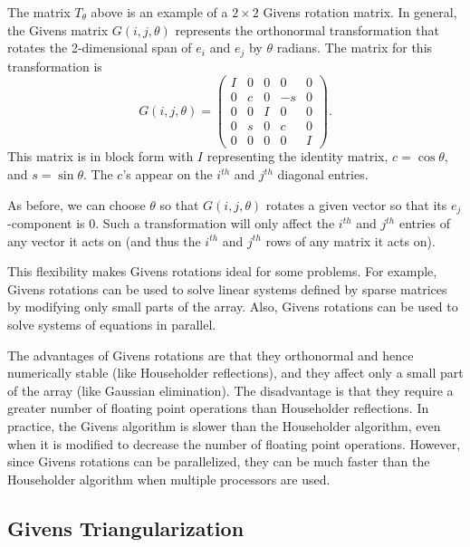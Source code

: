 The matrix $T_{\theta}$ above is an example of a $2 \times 2$ Givens rotation matrix.
In general, the Givens matrix $G(i,j,\theta)$ represents the orthonormal transformation that rotates the 2-dimensional span of $e_i$ and $e_j$ by $\theta$ radians.
The matrix for this transformation is
\begin{equation*}
G(i,j,\theta) = \begin{pmatrix}
I & 0 & 0 & 0 & 0 \\
0 & c & 0 & -s & 0 \\
0 & 0 & I & 0 & 0 \\
0 & s & 0 & c & 0 \\
0 & 0 & 0 & 0 & I
\end{pmatrix}.
\end{equation*}
This matrix is in block form with $I$ representing the identity matrix, $c=\cos \theta$, and $s=\sin \theta$.
The $c$'s appear on the $i^{th}$ and $j^{th}$ diagonal entries.

As before, we can choose $\theta$ so that $G(i,j,\theta)$ rotates a given vector so that its $e_j$-component is 0.
Such a transformation will only affect the $i^{th}$ and $j^{th}$ entries of any vector it acts on (and thus the $i^{th}$ and $j^{th}$ rows of any matrix it acts on).

This flexibility makes Givens rotations ideal for some problems.
For example, Givens rotations can be used to solve linear systems defined by sparse matrices by modifying only small parts of the array.
Also, Givens rotations can be used to solve systems of equations in parallel.

The advantages of Givens rotations are that they orthonormal and hence numerically stable (like Householder reflections), and they affect only a small part of the array (like Gaussian elimination).
The disadvantage is that they require a greater number of floating point operations than Householder reflections.
In practice, the Givens algorithm is slower than the Householder algorithm, even when it is modified to decrease the number of floating point operations.
However, since Givens rotations can be parallelized, they can be much faster than the Householder algorithm when multiple processors are used.

\subsection*{Givens Triangularization} %

